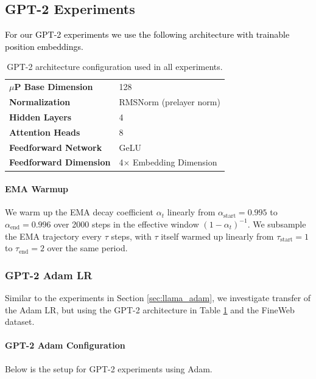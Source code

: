 \documentclass{article} %
\newcommand{\rev}[1]{\textcolor{black}{#1}}
\begin{document}
\newpage
\subsection{GPT-2 Experiments}\label{app:gpt}

\rev{For our GPT-2 experiments we use the following architecture with trainable position embeddings.}

\begin{table}[ht]
\centering
\small
\renewcommand{\arraystretch}{1.2}
\begin{tabular}{@{}ll@{}}
\toprule
\textbf{$\mu$P Base Dimension} & 128 \\
\addlinespace
\textbf{Normalization} & RMSNorm (prelayer norm) \\
\addlinespace
\textbf{Hidden Layers} & 4 \\
\addlinespace
\textbf{Attention Heads} & 8 \\
\addlinespace
\textbf{Feedforward Network} & GeLU\\
\addlinespace
\textbf{Feedforward Dimension} & 4$\times$ Embedding Dimension\\
\bottomrule
\end{tabular}
\caption{GPT-2 architecture configuration used in all experiments.}
\label{tab:gpt2}
\end{table}

\paragraph{EMA Warmup}  
We warm up the EMA decay coefficient \(\alpha_t\) linearly from \(\alpha_{\mathrm{start}}=0.995\) to \(\alpha_{\mathrm{end}}=0.996\) over 2000 steps in the effective window \((1-\alpha_t)^{-1}\). We subsample the EMA trajectory every \(\tau\) steps, with \(\tau\) itself warmed up linearly from \(\tau_{\mathrm{start}}=1\) to \(\tau_{\mathrm{end}}=2\) over the same period.

\subsubsection{GPT-2 Adam LR}\label{app:gpt_adam_lr}
Similar to the experiments in Section \ref{sec:llama_adam}, we investigate transfer of the Adam LR, but using the GPT-2 architecture in Table \ref{tab:gpt2} and the FineWeb dataset.
\paragraph{GPT-2 Adam Configuration}
Below is the setup for GPT-2 experiments using Adam.  
\end{document}
